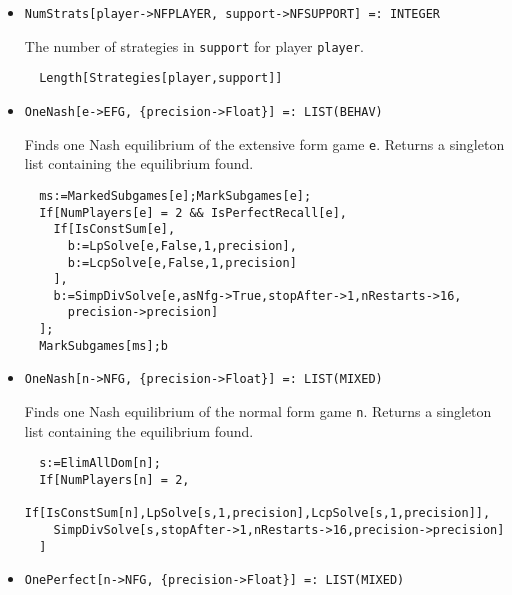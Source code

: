 \begin{itemize}
\item{}
\protect \large \begin{verbatim}
NumStrats[player->NFPLAYER, support->NFSUPPORT] =: INTEGER 
\end{verbatim}\normalsize

\bd 
The number of strategies in \verb+support+ for player \verb+player+.
\begin{verbatim}
  Length[Strategies[player,support]] 
\end{verbatim} 
\ed


\item{}
\protect \large \begin{verbatim}
OneNash[e->EFG, {precision->Float}] =: LIST(BEHAV) 
\end{verbatim}\normalsize

\bd 
Finds one Nash equilibrium of the extensive form game \verb+e+.
Returns a singleton list containing the equilibrium found.

\begin{verbatim}
  ms:=MarkedSubgames[e];MarkSubgames[e];
  If[NumPlayers[e] = 2 && IsPerfectRecall[e],
    If[IsConstSum[e],
      b:=LpSolve[e,False,1,precision],
      b:=LcpSolve[e,False,1,precision]
    ],
    b:=SimpDivSolve[e,asNfg->True,stopAfter->1,nRestarts->16,
      precision->precision]
  ];
  MarkSubgames[ms];b
\end{verbatim} 
\ed

\item{}
\protect \large \begin{verbatim}
OneNash[n->NFG, {precision->Float}] =: LIST(MIXED) 
\end{verbatim}\normalsize

\bd 
Finds one Nash equilibrium of the normal form game \verb+n+.
Returns a singleton list containing the equilibrium found.

\begin{verbatim}
  s:=ElimAllDom[n];
  If[NumPlayers[n] = 2,
    If[IsConstSum[n],LpSolve[s,1,precision],LcpSolve[s,1,precision]],
    SimpDivSolve[s,stopAfter->1,nRestarts->16,precision->precision]
  ]
\end{verbatim} 
\ed

\item{}
\protect \large \begin{verbatim}
OnePerfect[n->NFG, {precision->Float}] =: LIST(MIXED) 
\end{verbatim}\normalsize


\end{itemize}
